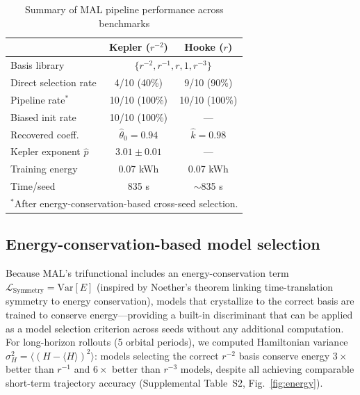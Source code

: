 \documentclass[aps,pre,reprint,superscriptaddress,longbibliography]{revtex4-2}
\begin{document}
\begin{table}[!t]
\centering
\caption{Summary of MAL pipeline performance across benchmarks}
\label{tab:summary}
\small
\begin{tabular}{lcc}
\hline
 & Kepler ($r^{-2}$) & Hooke ($r$) \\
\hline
Basis library & \multicolumn{2}{c}{$\{r^{-2}, r^{-1}, r, 1, r^{-3}\}$} \\
Direct selection rate & 4/10 (40\%) & 9/10 (90\%) \\
Pipeline rate$^*$ & 10/10 (100\%) & 10/10 (100\%) \\
Biased init rate & 10/10 (100\%) & --- \\
Recovered coeff. & $\hat{\theta}_0 = 0.94$ & $\hat{k} = 0.98$ \\
Kepler exponent $\hat{p}$ & $3.01 \pm 0.01$ & --- \\
Training energy & 0.07 kWh & 0.07 kWh \\
Time/seed & 835 s & $\sim$835 s \\
\hline
\multicolumn{3}{l}{\footnotesize $^*$After energy-conservation-based cross-seed selection.} \\
\end{tabular}
\end{table}

\subsection{Energy-conservation-based model selection}
Because MAL's trifunctional includes an energy-conservation term $\mathcal{L}_{\mathrm{Symmetry}} = \mathrm{Var}[E]$ (inspired by Noether's theorem linking time-translation symmetry to energy conservation), models that crystallize to the correct basis are trained to conserve energy---providing a built-in discriminant that can be applied as a model selection criterion across seeds without any additional computation. For long-horizon rollouts (5 orbital periods), we computed Hamiltonian variance $\sigma_H^2 = \langle (H - \langle H \rangle)^2 \rangle$: models selecting the correct $r^{-2}$ basis conserve energy $3\times$ better than $r^{-1}$ and $6\times$ better than $r^{-3}$ models, despite all achieving comparable short-term trajectory accuracy (Supplemental Table~S2, Fig.~\ref{fig:energy}).
\end{document}
